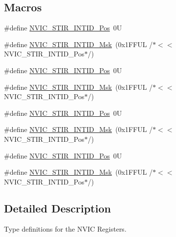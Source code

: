 \subsection*{Macros}
\begin{DoxyCompactItemize}
\item 
\#define \hyperlink{group___c_m_s_i_s___n_v_i_c_ga9eebe495e2e48d302211108837a2b3e8}{N\-V\-I\-C\-\_\-\-S\-T\-I\-R\-\_\-\-I\-N\-T\-I\-D\-\_\-\-Pos}~0\-U
\item 
\#define \hyperlink{group___c_m_s_i_s___n_v_i_c_gae4060c4dfcebb08871ca4244176ce752}{N\-V\-I\-C\-\_\-\-S\-T\-I\-R\-\_\-\-I\-N\-T\-I\-D\-\_\-\-Msk}~(0x1\-F\-F\-U\-L /$\ast$$<$$<$ N\-V\-I\-C\-\_\-\-S\-T\-I\-R\-\_\-\-I\-N\-T\-I\-D\-\_\-\-Pos$\ast$/)
\item 
\#define \hyperlink{group___c_m_s_i_s___n_v_i_c_ga9eebe495e2e48d302211108837a2b3e8}{N\-V\-I\-C\-\_\-\-S\-T\-I\-R\-\_\-\-I\-N\-T\-I\-D\-\_\-\-Pos}~0\-U
\item 
\#define \hyperlink{group___c_m_s_i_s___n_v_i_c_gae4060c4dfcebb08871ca4244176ce752}{N\-V\-I\-C\-\_\-\-S\-T\-I\-R\-\_\-\-I\-N\-T\-I\-D\-\_\-\-Msk}~(0x1\-F\-F\-U\-L /$\ast$$<$$<$ N\-V\-I\-C\-\_\-\-S\-T\-I\-R\-\_\-\-I\-N\-T\-I\-D\-\_\-\-Pos$\ast$/)
\item 
\#define \hyperlink{group___c_m_s_i_s___n_v_i_c_ga9eebe495e2e48d302211108837a2b3e8}{N\-V\-I\-C\-\_\-\-S\-T\-I\-R\-\_\-\-I\-N\-T\-I\-D\-\_\-\-Pos}~0\-U
\item 
\#define \hyperlink{group___c_m_s_i_s___n_v_i_c_gae4060c4dfcebb08871ca4244176ce752}{N\-V\-I\-C\-\_\-\-S\-T\-I\-R\-\_\-\-I\-N\-T\-I\-D\-\_\-\-Msk}~(0x1\-F\-F\-U\-L /$\ast$$<$$<$ N\-V\-I\-C\-\_\-\-S\-T\-I\-R\-\_\-\-I\-N\-T\-I\-D\-\_\-\-Pos$\ast$/)
\item 
\#define \hyperlink{group___c_m_s_i_s___n_v_i_c_ga9eebe495e2e48d302211108837a2b3e8}{N\-V\-I\-C\-\_\-\-S\-T\-I\-R\-\_\-\-I\-N\-T\-I\-D\-\_\-\-Pos}~0\-U
\item 
\#define \hyperlink{group___c_m_s_i_s___n_v_i_c_gae4060c4dfcebb08871ca4244176ce752}{N\-V\-I\-C\-\_\-\-S\-T\-I\-R\-\_\-\-I\-N\-T\-I\-D\-\_\-\-Msk}~(0x1\-F\-F\-U\-L /$\ast$$<$$<$ N\-V\-I\-C\-\_\-\-S\-T\-I\-R\-\_\-\-I\-N\-T\-I\-D\-\_\-\-Pos$\ast$/)
\end{DoxyCompactItemize}


\subsection{Detailed Description}
Type definitions for the N\-V\-I\-C Registers. 

